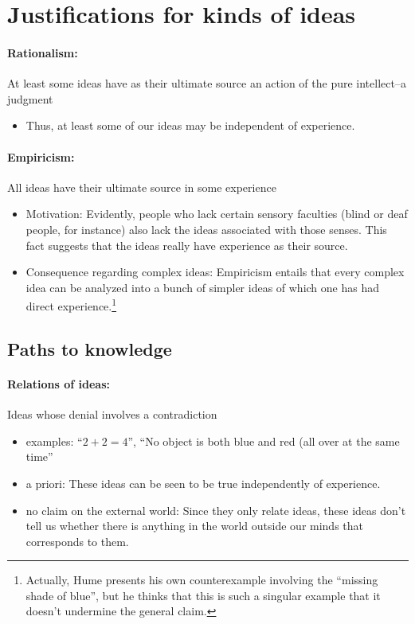 \documentclass[10pt]{article}
\begin{document}
\section{Justifications for kinds of ideas}

\paragraph{Rationalism:} At least some ideas have as their ultimate source an action of the pure intellect--a judgment
\begin{itemize}
 \item Thus, at least some of our ideas may be independent of experience.
\end{itemize}

\paragraph{Empiricism:} All ideas have their ultimate source in some experience 
\begin{itemize}
 \item Motivation: Evidently, people who lack certain sensory faculties (blind or deaf people, for instance) also lack the ideas associated with those senses.  This fact suggests that the ideas really have experience as their source.
 
 \item Consequence regarding complex ideas: Empiricism entails that every complex idea can be analyzed into a bunch of simpler ideas of which one has had direct experience.\footnote{Actually, Hume presents his own counterexample involving the ``missing shade of blue'', but he thinks that this is such a singular example that it doesn't undermine the general claim.}
\end{itemize}

\subsection{Paths to knowledge}

\paragraph{Relations of ideas:} Ideas whose denial involves a contradiction
\begin{itemize}
 \item examples: ``$2+2=4$'', ``No object is both blue and red (all over at the same time''
 \item a priori: These ideas can be seen to be true independently of experience.
 \item no claim on the external world: Since they only relate ideas, these ideas don't tell us whether there is anything in the world outside our minds that corresponds to them.
\end{itemize}
\end{document}
